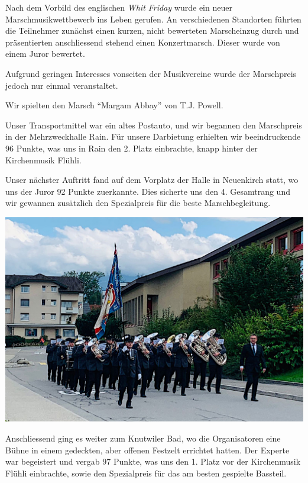 \begin{history}

    Nach dem Vorbild des englischen \emph{Whit Friday} wurde ein neuer
    Marschmusikwettbewerb ins Leben gerufen. An verschiedenen Standorten führten
    die Teilnehmer zunächst einen kurzen, nicht bewerteten Marscheinzug durch
    und präsentierten anschliessend stehend einen Konzertmarsch. Dieser wurde
    von einem Juror bewertet.

    Aufgrund geringen Interesses vonseiten der Musikvereine wurde der
    Marschpreis jedoch nur einmal veranstaltet.

    Wir spielten den Marsch \enquote{Margam Abbay} von T.J. Powell.

    Unser Transportmittel war ein altes Postauto, und wir begannen den
    Marschpreis in der Mehrzweckhalle Rain. Für unsere Darbietung erhielten wir
    beeindruckende 96 Punkte, was uns in Rain den 2. Platz einbrachte, knapp
    hinter der Kirchenmusik Flühli.

    Unser nächster Auftritt fand auf dem Vorplatz der Halle in Neuenkirch statt,
    wo uns der Juror 92 Punkte zuerkannte. Dies sicherte uns den 4. Gesamtrang
    und wir gewannen zusätzlich den Spezialpreis für die beste Marschbegleitung.

    \begin{MulticolFigure}
        \centering
        \includegraphics[width=0.93\linewidth]{./chap/2001-2024/2022/Einmarsch-Neuenkirch.jpg}
    \end{MulticolFigure}

    Anschliessend ging es weiter zum Knutwiler Bad, wo die Organisatoren eine
    Bühne in einem gedeckten, aber offenen Festzelt errichtet hatten. Der
    Experte war begeistert und vergab 97 Punkte, was uns den 1. Platz vor der
    Kirchenmusik Flühli einbrachte, sowie den Spezialpreis für das am besten
    gespielte Bassteil.


\end{history}
